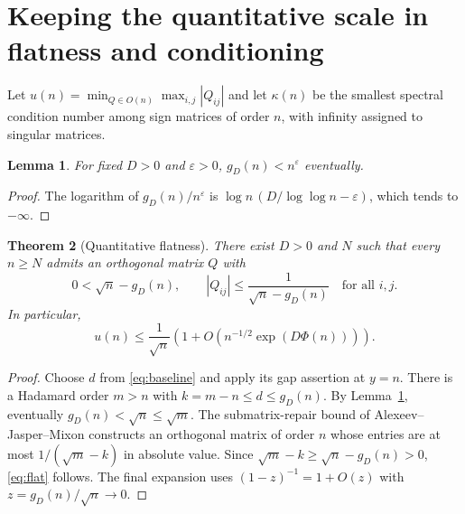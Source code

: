 \documentclass[11pt]{article}
\newtheorem{theorem}{Theorem}[section]
\newtheorem{lemma}[theorem]{Lemma}
\newcommand{\ph}{\Phi}
\begin{document}
\section{Keeping the quantitative scale in flatness and conditioning}
Let $u(n)=\min_{Q\in O(n)}\max_{i,j}|Q_{ij}|$ and let $\kappa(n)$ be the
smallest spectral condition number among sign matrices of order $n$,
with infinity assigned to singular matrices.

\begin{lemma}\label{lem:small}
For fixed $D>0$ and $\varepsilon>0$, $g_D(n)<n^\varepsilon$ eventually.
\end{lemma}
\begin{proof}
The logarithm of $g_D(n)/n^\varepsilon$ is
$\log n\,(D/\log\log n-\varepsilon)$, which tends to $-\infty$.
\end{proof}

\begin{theorem}[Quantitative flatness]\label{thm:flat}
There exist $D>0$ and $N$ such that every $n\ge N$ admits an orthogonal
matrix $Q$ with
\begin{equation}\label{eq:flat}
0<\sqrt n-g_D(n),\qquad
|Q_{ij}|\le\frac1{\sqrt n-g_D(n)}\quad\text{for all }i,j.
\end{equation}
In particular,
\[
u(n)\le\frac1{\sqrt n}\left(1+
O\!\left(n^{-1/2}\exp(D\ph(n))\right)\right).
\]
\end{theorem}
\begin{proof}
Choose $d$ from \eqref{eq:baseline} and apply its gap assertion at $y=n$.
There is a Hadamard order $m>n$ with $k=m-n\le d\le g_D(n)$.
By Lemma~\ref{lem:small}, eventually $g_D(n)<\sqrt n\le\sqrt m$.
The submatrix-repair bound of Alexeev--Jasper--Mixon
\cite[Lemmas 3 and 4]{AJM} constructs an orthogonal matrix of order $n$
whose entries are at most $1/(\sqrt m-k)$ in absolute value.
Since $\sqrt m-k\ge\sqrt n-g_D(n)>0$, \eqref{eq:flat} follows.
The final expansion uses $(1-z)^{-1}=1+O(z)$ with
$z=g_D(n)/\sqrt n\to0$.
\end{proof}
\end{document}
